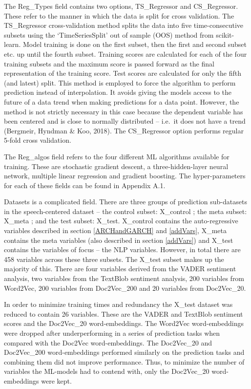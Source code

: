 \documentclass[11pt,preprint, authoryear]{elsarticle}
\numberwithin{equation}{section}
\numberwithin{figure}{section}
\numberwithin{table}{section}
\begin{document}
The Reg\_Types field contains two options, TS\_Regressor and
CS\_Regressor. These refer to the manner in which the data is split for
cross validation. The TS\_Regressor cross-validation method splits the
data into five time-consecutive subsets using the `TimeSeriesSplit' out
of sample (OOS) method from scikit-learn. Model training is done on the
first subset, then the first and second subset etc. up until the fourth
subset. Training scores are calculated for each of the four training
subsets and the maximum score is passed forward as the final
representation of the training score. Test scores are calculated for
only the fifth (and latest) split. This method is employed to force the
algorithm to perform prediction instead of interpolation. It avoids
giving the models access to the future of a data trend when making
predictions for a data point. However, the method is not strictly
necessary in this case because the dependent variable has been centered
and is close to normally distributed -- i.e.~it does not have a trend
(Bergmeir, Hyndman \& Koo, 2018). The CS\_Regressor option performs
regular 5-fold cross validation.

The Reg\_algos field refers to the four different ML algorithms
available for training. These are stochastic gradient descent, a
three-hidden-layer neural network, multiple linear regression and
gradient boosting. The hyper-parameters for each of these fields can be
found in Appendix A.1.

Datasets is a complicated field. There are three groups of prediction
sub-datasets in the speech-centered dataset -- the control subset:
X\_control ; the meta subset: X\_meta ; and the test subset: X\_test.
X\_control contains the auto-regressive variables described in section
\ref{ARCHandGARCH} and \ref{addVars}, X\_meta contains the meta
variables (also described in section \ref{addVars}) and X\_test contains
the variables of focus -- the NLP variables. However, in total there are
458 variables across these three subsets. The X\_test subset makes up
the majority of this. There are four variables derived from the VADER
sentiment analysis, two variables from the TextBlob sentiment analysis,
200 variables from Word2Vec, 200 variables from Doc2Vec\_200 and 20
variables from Doc2Vec\_20.

In order to minimize training times and redundancy the X\_test dataset
was reduced to contain 26 variables. These are the VADER and TextBlob
sentiment scores and the Doc2Vec\_20 word-embeddings. The Word2Vec
word-embeddings were dropped after underperforming in a series of
prediction tasks when compared with the Doc2Vec word-embeddings. The
Doc2Vec\_20 and Doc2Vec\_200 word-embeddings performed similarly on the
prediction tasks and combining them did not improve performance. Thus,
to minimize the number of variables the ML-models had to contend with,
only the Doc2Vec\_20 word-embeddings were kept.
\end{document}
